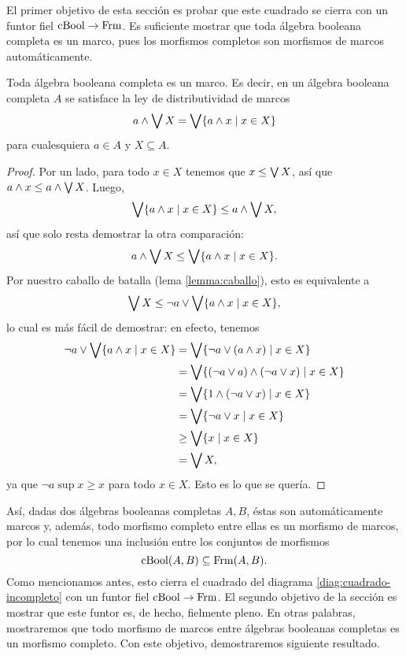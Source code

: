 El primer objetivo de esta sección es probar que este cuadrado se
cierra con un funtor fiel $\mathrm{cBool}\to\mathrm{Frm}$.
Es suficiente mostrar que toda álgebra booleana completa es un marco,
pues los morfismos completos son morfismos de marcos automáticamente.

\begin{lemma}
    Toda álgebra booleana completa es un marco.
    Es decir, en un álgebra booleana completa $A$ se satisface la
    ley de distributividad de marcos
    \[
        a\wedge\bigvee X = \bigvee\{a\wedge x\mid x\in X\}
    \]
    para cualesquiera $a\in A$ y $X\subseteq A$.
\end{lemma}
\begin{proof}
    Por un lado, para todo $x\in X$ tenemos que $x\leq\bigvee X$, así que
    $a\wedge x\leq a\wedge\bigvee X$.
    Luego,
    \[
        \bigvee\{a\wedge x\mid x\in X\} \leq a\wedge\bigvee X
    ,\]
    así que solo resta demostrar la otra comparación:
    \[
        a\wedge\bigvee X \leq \bigvee\{a\wedge x\mid x\in X\}
    .\]
    Por nuestro caballo de batalla (lema \ref{lemma:caballo}),
    esto es equivalente a
    \[
        \bigvee X \leq \neg a\vee \bigvee\{a\wedge x\mid x\in X\}
    ,\]
    lo cual es más fácil de demostrar: en efecto, tenemos
    \begin{align*}
        \neg a\vee\bigvee\{a\wedge x\mid x\in X\}
        &= \bigvee\{\neg a \vee(a\wedge x) \mid x\in X\} \\
        &= \bigvee\{(\neg a\vee a)\wedge(\neg a\vee x) \mid x\in X\} \\
        &= \bigvee\{1\wedge(\neg a\vee x) \mid x\in X\} \\
        &= \bigvee\{\neg a\vee x \mid x\in X\} \\
        &\geq \bigvee\{x \mid x\in X\} \\
        &= \bigvee X,
    \end{align*}
    ya que $\neg a\sup x\geq x$ para todo $x\in X$.
    Esto es lo que se quería.
\end{proof}

Así, dadas dos álgebras booleanas completas $A,B$,
éstas son automáticamente marcos y, además, todo morfismo completo
entre ellas es un morfismo de marcos, por lo cual
tenemos una inclusión entre los conjuntos de morfismos
\[
  \mathrm{cBool}(A,B) \subseteq \mathrm{Frm}(A,B)
.\]
Como mencionamos antes, esto cierra el cuadrado del diagrama
\eqref{diag:cuadrado-incompleto} con un funtor fiel
$\mathrm{cBool}\to\mathrm{Frm}$.
El segundo objetivo de la sección es mostrar que este funtor
es, de hecho, fielmente pleno.
En otras palabras, mostraremos que todo morfismo de marcos entre
álgebras booleanas completas es un morfismo completo.
Con este objetivo, demostraremos siguiente resultado.

